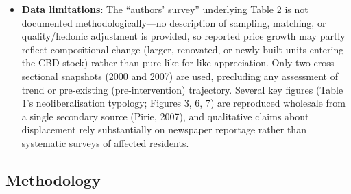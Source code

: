 \begin{itemize}
  \item \textbf{Data limitations}: The ``authors' survey'' underlying Table 2 is not documented methodologically---no description of sampling, matching, or quality/hedonic adjustment is provided, so reported price growth may partly reflect compositional change (larger, renovated, or newly built units entering the CBD stock) rather than pure like-for-like appreciation. Only two cross-sectional snapshots (2000 and 2007) are used, precluding any assessment of trend or pre-existing (pre-intervention) trajectory. Several key figures (Table 1's neoliberalisation typology; Figures 3, 6, 7) are reproduced wholesale from a single secondary source (Pirie, 2007), and qualitative claims about displacement rely substantially on newspaper reportage rather than systematic surveys of affected residents.
\end{itemize}

\subsection*{Methodology}

